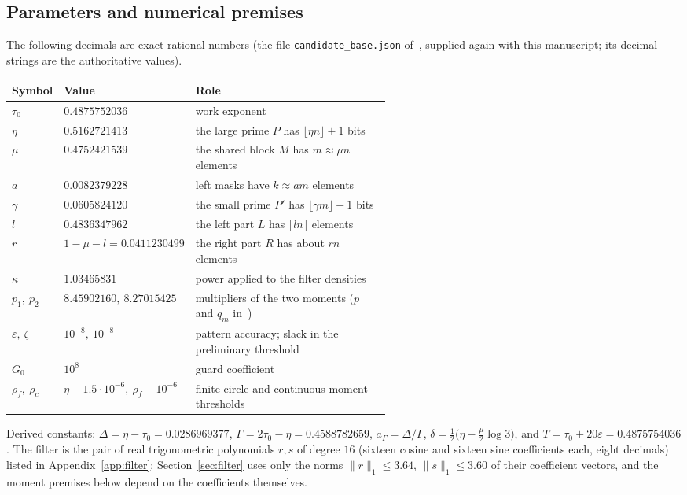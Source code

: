 \documentclass[11pt]{article}
\theoremstyle{definition}
\newcommand{\eps}{\varepsilon}
\newcommand{\floor}[1]{\lfloor #1\rfloor}
\begin{document}
\subsection{Parameters and numerical premises}\label{sec:params}
The following decimals are exact rational numbers (the file \texttt{candidate\_base.json} of~\cite{V}, supplied
again with this manuscript; its decimal strings are the authoritative values).
\begin{center}
\begin{tabular}{llp{0.56\linewidth}}
\toprule
Symbol & Value & Role\\
\midrule
$\tau_0$ & $0.4875752036$ & work exponent\\
$\eta$ & $0.5162721413$ & the large prime $P$ has $\floor{\eta n}+1$ bits\\
$\mu$ & $0.4752421539$ & the shared block $M$ has $m\approx\mu n$ elements\\
$a$ & $0.0082379228$ & left masks have $k\approx am$ elements\\
$\gamma$ & $0.0605824120$ & the small prime $P'$ has $\floor{\gamma m}+1$ bits\\
$l$ & $0.4836347962$ & the left part $L$ has $\floor{ln}$ elements\\
$r$ & $1-\mu-l=0.0411230499$ & the right part $R$ has about $rn$ elements\\
$\kappa$ & $1.03465831$ & power applied to the filter densities\\
$p_1,\ p_2$ & $8.45902160,\ 8.27015425$ & multipliers of the two moments ($p$ and $q_m$ in~\cite{V})\\
$\eps,\ \zeta$ & $10^{-8},\ 10^{-8}$ & pattern accuracy; slack in the preliminary threshold\\
$G_0$ & $10^{8}$ & guard coefficient\\
$\rho_f,\ \rho_c$ & $\eta-1.5\cdot10^{-6},\ \rho_f-10^{-6}$ & finite-circle and continuous moment thresholds\\
\bottomrule
\end{tabular}
\end{center}
Derived constants: $\Delta=\eta-\tau_0=0.0286969377$, $\Gamma=2\tau_0-\eta=0.4588782659$, $a_\Gamma=\Delta/\Gamma$,
$\delta=\tfrac12\bigl(\eta-\tfrac\mu2\log3\bigr)$, and $T=\tau_0+20\eps=0.4875754036$. The filter is the pair of real
trigonometric polynomials $r,s$ of degree $16$ (sixteen cosine and sixteen sine coefficients each, eight decimals)
listed in Appendix~\ref{app:filter}; Section~\ref{sec:filter} uses only the norms
$\|r\|_{1}\le3.64$, $\|s\|_1\le3.60$ of their coefficient vectors, and the moment premises below depend on the
coefficients themselves.
\end{document}

